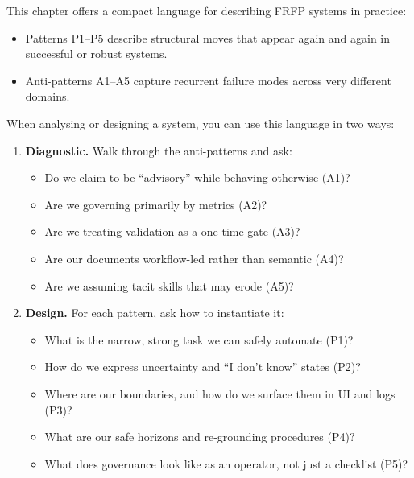 This chapter offers a compact language for describing FRFP systems in
practice:

\begin{itemize}
  \item Patterns P1--P5 describe structural moves that appear again and
        again in successful or robust systems.
  \item Anti-patterns A1--A5 capture recurrent failure modes across
        very different domains.
\end{itemize}

When analysing or designing a system, you can use this language in two
ways:

\begin{enumerate}
  \item \textbf{Diagnostic.}
        Walk through the anti-patterns and ask:
        \begin{itemize}
          \item Do we claim to be ``advisory'' while behaving
                otherwise (A1)?
          \item Are we governing primarily by metrics (A2)?
          \item Are we treating validation as a one-time gate (A3)?
          \item Are our documents workflow-led rather than semantic
                (A4)?
          \item Are we assuming tacit skills that may erode (A5)?
        \end{itemize}
  \item \textbf{Design.}
        For each pattern, ask how to instantiate it:
        \begin{itemize}
          \item What is the narrow, strong task we can safely
                automate (P1)?
          \item How do we express uncertainty and ``I don't know''
                states (P2)?
          \item Where are our boundaries, and how do we surface them
                in UI and logs (P3)?
          \item What are our safe horizons and re-grounding
                procedures (P4)?
          \item What does governance look like as an operator, not
                just a checklist (P5)?
\end{itemize}
\end{enumerate}